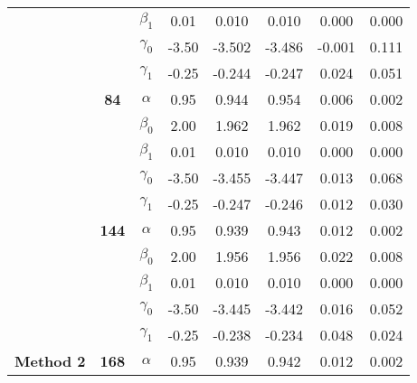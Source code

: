 \begin{table}[h]
\begin{tabular}[t]{>{}c>{}ccccccc}
 &  & $\beta_1$ & 0.01 & 0.010 & 0.010 & 0.000 & 0.000\\

 &  & $\gamma_0$ & -3.50 & -3.502 & -3.486 & -0.001 & 0.111\\

 &  & $\gamma_1$ & -0.25 & -0.244 & -0.247 & 0.024 & 0.051\\

 & \multirow{-5}{*}{\centering\arraybackslash \textbf{84}} & $\alpha$ & 0.95 & 0.944 & 0.954 & 0.006 & 0.002\\

 &  & $\beta_0$ & 2.00 & 1.962 & 1.962 & 0.019 & 0.008\\

 &  & $\beta_1$ & 0.01 & 0.010 & 0.010 & 0.000 & 0.000\\

 &  & $\gamma_0$ & -3.50 & -3.455 & -3.447 & 0.013 & 0.068\\

 &  & $\gamma_1$ & -0.25 & -0.247 & -0.246 & 0.012 & 0.030\\

 & \multirow{-5}{*}{\centering\arraybackslash \textbf{144}} & $\alpha$ & 0.95 & 0.939 & 0.943 & 0.012 & 0.002\\

 &  & $\beta_0$ & 2.00 & 1.956 & 1.956 & 0.022 & 0.008\\

 &  & $\beta_1$ & 0.01 & 0.010 & 0.010 & 0.000 & 0.000\\

 &  & $\gamma_0$ & -3.50 & -3.445 & -3.442 & 0.016 & 0.052\\

 &  & $\gamma_1$ & -0.25 & -0.238 & -0.234 & 0.048 & 0.024\\

\multirow{-15}{*}{\centering\arraybackslash \textbf{Method 2}} & \multirow{-5}{*}{\centering\arraybackslash \textbf{168}} & $\alpha$ & 0.95 & 0.939 & 0.942 & 0.012 & 0.002\\
\bottomrule
\end{tabular}
\end{table}
